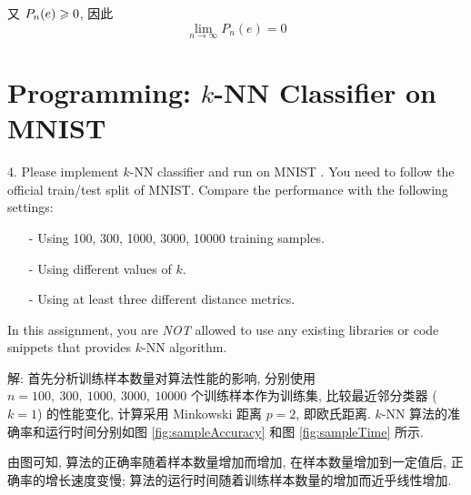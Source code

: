 \documentclass{article}
\begin{document}
又 $P_n(e)\geqslant0$, 因此
\begin{equation}
  \lim_{n\to\infty}P_n(e)=0
\end{equation}

\section*{Programming: $k$-NN Classifier on MNIST}

4. Please implement $k$-NN classifier and run on MNIST \cite{mnist}. You need to follow the official train/test split of MNIST. Compare the performance with the following settings:

\begin{enumerate}
	\item[-] Using 100, 300, 1000, 3000, 10000 training samples.
	\item[-] Using different values of $k$.
	\item[-] Using at least three different distance metrics.
\end{enumerate}

In this assignment, you are \emph{NOT} allowed to use any existing libraries or code snippets that provides $k$-NN algorithm.

解: 首先分析训练样本数量对算法性能的影响, 分别使用 $n=100,~300,~1000,~3000,~10000$ 个训练样本作为训练集, 比较最近邻分类器 ($k=1$) 的性能变化, 计算采用 Minkowski 距离 $p=2$, 即欧氏距离. $k$-NN 算法的准确率和运行时间分别如图 \ref{fig:sampleAccuracy} 和图 \ref{fig:sampleTime} 所示.

由图可知, 算法的正确率随着样本数量增加而增加, 在样本数量增加到一定值后, 正确率的增长速度变慢; 算法的运行时间随着训练样本数量的增加而近乎线性增加.
\end{document}
